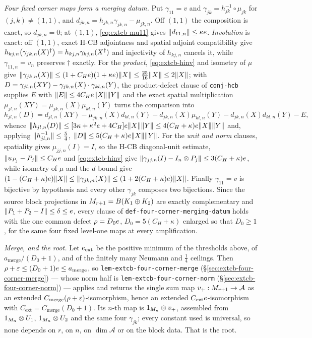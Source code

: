 \emph{Four fixed corner maps form a merging datum.} Put $\gamma_{11}=v$ and
$\gamma_{jk}=h_{jk}^{-1}\circ\mu_{jk}$ for $(j,k)\ne(1,1)$, and
$d_{jk,n}=h_{jk,n}\gamma_{jk,n}-\mu_{jk,n}$. Off $(1,1)$ the composition is exact, so
$d_{jk,n}=0$; at $(1,1)$, \eqref{eq:extcb-mu11} gives $\lVert d_{11,n}\rVert\le\kappa e$.
\emph{Involution} is exact: off $(1,1)$, exact H-CB adjointness and spatial adjoint
compatibility give $h_{kj,n}\bigl(\gamma_{jk,n}(X)^{\dagger}\bigr)=h_{kj,n}\gamma_{kj,n}(X^{\dagger})$
and injectivity of $h_{kj,n}$ cancels it, while $\gamma_{11,n}=v_n$ preserves $\dagger$
exactly. For the \emph{product}, \eqref{eq:extcb-hinv} and isometry of $\mu$ give
$\lVert \gamma_{jk,n}(X)\rVert\le(1+C_He)(1+\kappa e)\lVert X\rVert\le\tfrac{25}{16}\lVert X\rVert\le2\lVert X\rVert$;
with $D=\gamma_{jl,n}(XY)-\gamma_{jk,n}(X)\mathbin{\cdot}\gamma_{kl,n}(Y)$, the product-defect clause
of \texttt{conj-hcb} supplies $E$ with $\lVert E\rVert\le4C_He\lVert X\rVert\lVert Y\rVert$ and the exact
spatial multiplication $\mu_{jl,n}(XY)=\mu_{jk,n}(X)\mu_{kl,n}(Y)$ turns the comparison into
\[
  h_{jl,n}(D)=d_{jl,n}(XY)-\mu_{jk,n}(X)d_{kl,n}(Y)-d_{jk,n}(X)\mu_{kl,n}(Y)
              -d_{jk,n}(X)d_{kl,n}(Y)-E ,
\]
whence $\lVert h_{jl,n}(D)\rVert\le[3\kappa+\kappa^{2}e+4C_H]e\lVert X\rVert\lVert Y\rVert
\le4(C_H+\kappa)e\lVert X\rVert\lVert Y\rVert$ and, applying $\lVert h_{jl,n}^{-1}\rVert\le\tfrac54$,
$\lVert D\rVert\le5(C_H+\kappa)e\lVert X\rVert\lVert Y\rVert$. For the \emph{unit and norm} clauses,
spatiality gives $\mu_{jj,n}(I)=I$, so the H-CB diagonal-unit estimate,
$\lVert u_{P_j}-P_j\rVert\le C_He$ and \eqref{eq:extcb-hinv} give
$\lVert \gamma_{jj,n}(I)-I_{n}\otimes P_j\rVert\le3(C_H+\kappa)e$, while isometry of $\mu$ and
the $d$-bound give
$(1-(C_H+\kappa)e)\lVert X\rVert\le\lVert \gamma_{jk,n}(X)\rVert\le(1+2(C_H+\kappa)e)\lVert X\rVert$.
Finally $\gamma_{11}=v$ is bijective by hypothesis and every other $\gamma_{jk}$ composes
two bijections. Since the source block projections in $M_{r+1}=B(K_1\oplus K_2)$ are
exactly complementary and $\lVert P_1+P_2-I\rVert\le\delta\le e$, every clause of
\texttt{def-four-corner-merging-datum} holds with the one common defect $\rho=D_0e$,
$D_0=5(C_H+\kappa)$ enlarged so that $D_0\ge1$, for the same four fixed level-one maps at
every amplification.

\emph{Merge, and the root.} Let $e_{\mathrm{ext}}$ be the positive minimum of the
thresholds above, of $a_{\mathrm{merge}}/(D_0+1)$, and of the finitely many Neumann and
$\tfrac14$ ceilings. Then $\rho+\varepsilon\le(D_0+1)e\le a_{\mathrm{merge}}$, so
\texttt{lem-extcb-four-corner-merge} (\S\ref{sec:extcb-four-corner-merge}) --- whose norm
half is \texttt{lem-extcb-four-corner-norm} (\S\ref{sec:extcb-four-corner-norm}) --- applies
and returns the single sum map $v_+:M_{r+1}\to\mathcal A$ as an extended
$C_{\mathrm{merge}}(\rho+\varepsilon)$-isomorphism, hence an extended
$C_{\mathrm{ext}}e$-isomorphism with $C_{\mathrm{ext}}=C_{\mathrm{merge}}(D_0+1)$.
Its $n$-th map is $1_{M_{n}}\otimes v_+$, assembled from $1_{M_{n}}\otimes U_1$, $1_{M_{n}}\otimes U_2$ and the same
four $\gamma_{jk}$; every constant used is universal, so none depends on $r$, on $n$, on
$\dim\mathcal A$ or on the block data. That is the root.

